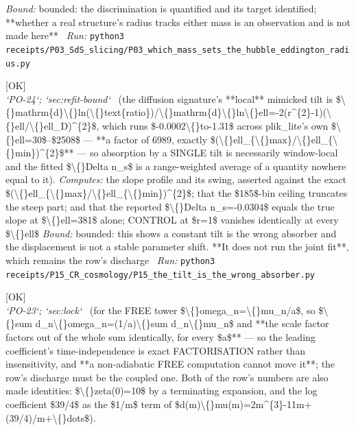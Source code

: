 \begin{description}
 \emph{Bound:} bounded: the discrimination is quantified and its target identified; **whether a real structure's radius tracks either mass is an observation and is not made here**
\ \emph{Run:} \texttt{python3 receipts/P03\_SdS\_slicing/P03\_which\_mass\_sets\_the\_hubble\_eddington\_radius.py}
\item[\label{rcpt:P15_the_tilt_is_the_wrong_absorber}\texttt{P15\_the\_tilt\_is\_the\_wrong\_absorber}]\hfill\textsf{[OK]}\\
\textit{`PO-24`; `sec:refit-bound`} \ (the diffusion signature's **local** mimicked tilt is \$\textbackslash\{\}mathrm\{d\}\textbackslash\{\}ln(\textbackslash\{\}text\{ratio\})/\textbackslash\{\}mathrm\{d\}\textbackslash\{\}ln\textbackslash\{\}ell=-2(r\textasciicircum{}\{2\}-1)(\textbackslash\{\}ell/\textbackslash\{\}ell\_D)\textasciicircum{}\{2\}\$, which runs \$-0.0002\textbackslash\{\}to-1.31\$ across plik\_lite's own \$\textbackslash\{\}ell=30\$--\$2508\$ --- **a factor of 6989, exactly \$(\textbackslash\{\}ell\_\{\textbackslash\{\}max\}/\textbackslash\{\}ell\_\{\textbackslash\{\}min\})\textasciicircum{}\{2\}\$** --- so absorption by a SINGLE tilt is necessarily window-local and the fitted \$\textbackslash\{\}Delta n\_s\$ is a range-weighted average of a quantity nowhere equal to it). 
\emph{Computes:} the slope profile and its swing, asserted against the exact \$(\textbackslash\{\}ell\_\{\textbackslash\{\}max\}/\textbackslash\{\}ell\_\{\textbackslash\{\}min\})\textasciicircum{}\{2\}\$; that the \$185\$-bin ceiling truncates the steep part; and that the reported \$\textbackslash\{\}Delta n\_s=-0.0304\$ equals the true slope at \$\textbackslash\{\}ell=381\$ alone; CONTROL at \$r=1\$ vanishes identically at every \$\textbackslash\{\}ell\$
 \emph{Bound:} bounded: this shows a constant tilt is the wrong absorber and the displacement is not a stable parameter shift. **It does not run the joint fit**, which remains the row's discharge
\ \emph{Run:} \texttt{python3 receipts/P15\_CR\_cosmology/P15\_the\_tilt\_is\_the\_wrong\_absorber.py}
\item[\label{rcpt:P10_the_scale_factor_factors_out_of_the_free_tower}\texttt{P10\_the\_scale\_factor\_factors\_out\_of\_the\_free\_tower}]\hfill\textsf{[OK]}\\
\textit{`PO-23`; `sec:lock`} \ (for the FREE tower \$\textbackslash\{\}omega\_n=\textbackslash\{\}mu\_n/a\$, so \$\textbackslash\{\}sum d\_n\textbackslash\{\}omega\_n=(1/a)\textbackslash\{\}sum d\_n\textbackslash\{\}mu\_n\$ and **the scale factor factors out of the whole sum identically, for every \$a\$** --- so the leading coefficient's time-independence is exact FACTORISATION rather than insensitivity, and **a non-adiabatic FREE computation cannot move it**; the row's discharge must be the coupled one. Both of the row's numbers are also made identities: \$\textbackslash\{\}zeta(0)=10\$ by a terminating expansion, and the log coefficient \$39/4\$ as the \$1/m\$ term of \$d(m)\textbackslash\{\}mu(m)=2m\textasciicircum{}\{3\}-11m+(39/4)/m+\textbackslash\{\}dots\$). 

\end{description}

